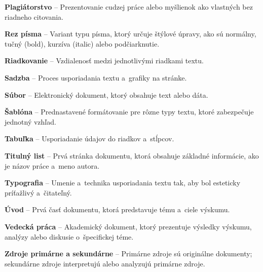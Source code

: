 \begin{trivlist}
  \item{\textbf{Plagiátorstvo}} -- Prezentovanie cudzej práce alebo myšlienok ako vlastných bez riadneho citovania.
  
  \item{\textbf{Rez písma}} -- Variant typu písma, ktorý určuje štýlové úpravy, ako sú normálny, tučný (bold), kurzíva (italic) alebo podčiarknutie.
  
  \item{\textbf{Riadkovanie}} -- Vzdialenosť medzi jednotlivými riadkami textu.
  
  \item{\textbf{Sadzba}} -- Proces usporiadania textu a~grafiky na stránke.
  
  \item{\textbf{Súbor}} -- Elektronický dokument, ktorý obsahuje text alebo dáta.
  
  \item{\textbf{Šablóna}} -- Prednastavené formátovanie pre rôzne typy textu, ktoré zabezpečuje jednotný vzhľad.
  
  \item{\textbf{Tabuľka}} -- Usporiadanie údajov do riadkov a~stĺpcov.
  
  \item{\textbf{Titulný list}} -- Prvá stránka dokumentu, ktorá obsahuje základné informácie, ako je názov práce a~meno autora.
  
  \item{\textbf{Typografia}} -- Umenie a~technika usporiadania textu tak, aby bol esteticky príťažlivý a~čitateľný.
  
  \item{\textbf{Úvod}} -- Prvá časť dokumentu, ktorá predstavuje tému a~ciele výskumu.
  
  \item{\textbf{Vedecká práca}} -- Akademický dokument, ktorý prezentuje výsledky výskumu, analýzy alebo diskusie o~špecifickej téme.
  
  \item{\textbf{Zdroje primárne a sekundárne}} -- Primárne zdroje sú originálne dokumenty; sekundárne zdroje interpretujú alebo analyzujú primárne zdroje.
\end{trivlist}
